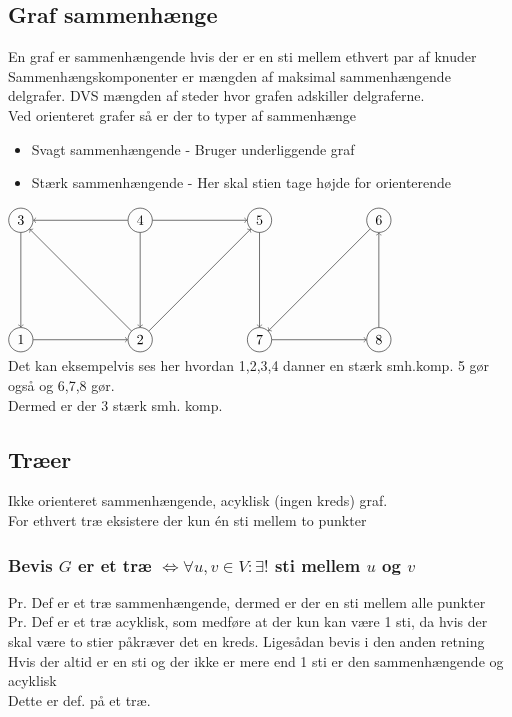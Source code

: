 \documentclass[12pt, a4paper]{article}
\begin{document}
	\subsection{Graf sammenhænge}
		En graf er sammenhængende hvis der er en sti mellem ethvert par af knuder\\
		Sammenhængskomponenter er mængden af maksimal sammenhængende delgrafer. DVS mængden af steder hvor grafen adskiller delgraferne.\\
		Ved orienteret grafer så er der to typer af sammenhænge\\
		\begin{itemize}
			\item Svagt sammenhængende - Bruger underliggende graf
			\item Stærk sammenhængende - Her skal stien tage højde for orienterende
		\end{itemize}
		$\begin{tikzpicture}[scale=3]
			\tikzstyle{vertex}=[circle,draw=black]
			\node[vertex](v1) at (0,0){1};
			\node[vertex](v2) at (1,0){2};
			\node[vertex](v4) at (0,1) {3};
			\node[vertex](v3) at (1,1) {4};
			\node[vertex](v5) at (2,1) {5};
			\node[vertex](v6) at (3,1) {6};
			\node[vertex](v7) at (2,0) {7};
			\node[vertex](v8) at (3,0) {8};
			\path[->]
				(v2) edge node {}(v5)
				(v3) edge node {}(v2)
				(v4) edge node {}(v1)
				(v3) edge node {}(v4)
				(v2) edge node {}(v4)
				(v3) edge node {}(v5)
				(v1) edge node {}(v2)
				(v5) edge node {}(v7)
				(v7) edge node {}(v8)
				(v6) edge node {}(v7)
				(v8) edge node {}(v6);
		\end{tikzpicture}$\\
		Det kan eksempelvis ses her hvordan 1,2,3,4 danner en stærk smh.komp. 5 gør også og 6,7,8 gør.\\
		Dermed er der 3 stærk smh. komp.
	\subsection{Træer}
		Ikke orienteret sammenhængende, acyklisk (ingen kreds) graf.\\
		For ethvert træ eksistere der kun én sti mellem to punkter
		\subsubsection{Bevis $G$ er et træ $\iff \forall u,v \in V: \exists !$ sti mellem $u$ og $v$}
			Pr. Def er et træ sammenhængende, dermed er der en sti mellem alle punkter\\
			Pr. Def er et træ acyklisk, som medføre at der kun kan være 1 sti, da hvis der skal være to stier påkræver det en kreds.
			Ligesådan bevis i den anden retning\\
			Hvis der altid er en sti og der ikke er mere end 1 sti er den sammenhængende og acyklisk\\
			Dette er def. på et træ.
\end{document}
